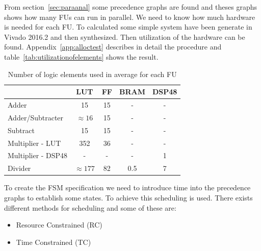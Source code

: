 From section~\vref{sec:paraanal} some precedence graphs are found and theses graphs shows how many FUs can run in parallel. We need to know how much hardware is needed for each FU. To calculated some simple system have been generate in Vivado 2016.2 and then synthesized. Then utilization of the hardware can be found. Appendix~\vref{app:alloctest} describes in detail the procedure and table~\ref{tab:utilizationofelements} shows the result.
\begin{table}[ht!]
\centering
\begin{tabular}{l | c c c c }
  \toprule
   &  LUT & FF & BRAM & DSP48 \\
  \midrule
  Adder & 15 & 15 & - & - \\
  Adder/Subtracter  & $\approx 16$ &  15 & - & - \\
  Subtract  & 15 &  15 & - & - \\
  Multiplier - LUT  & 352 &  36 & - & - \\
  Multiplier - DSP48 & - & - & - & 1 \\
  Divider & $\approx 177$ & 82 & 0.5 & 7 \\
  \bottomrule
\end{tabular}
\caption{Number of logic elements used in average for each FU}
\label{tab:apputilizationofelements}
\end{table}

To create the FSM specification we need to introduce time into the precedence graphs to establish some states. To achieve this scheduling is used. There exists different methods for scheduling and some of these are:
\begin{itemize}
  \item Resource Constrained (RC)
  \item Time Constrained (TC)
\end{itemize}

